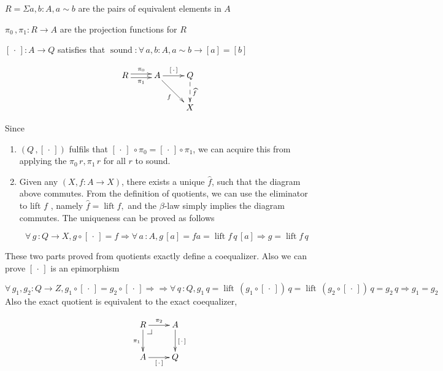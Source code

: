 \documentclass[envcountsame]{llncs}
\makeatletter
\newcommand{\dotph}{\,\cdot\,}
\providecommand{\class}[1]{[#1]}
\providecommand{\dlift}[1]{\widehat{#1}}
\DeclareMathOperator{\sound}{sound}
\DeclareMathOperator{\lift}{lift}
\newcommand{\pullbackcorner}[1][dr]{\save*!/#1-1.2pc/#1:(-1,1)@^{|-}\restore}
\makeatother
\begin{document}
$R = \Sigma a , b : A , a \sim b$  are the pairs of equivalent elements in $A$

$\pi_{0}\,,\pi_{1} \colon R \to A $ are the projection functions for $R$

$\class\dotph \colon A \to Q$ satisfies that $\sound \colon \forall\,a,b \colon A, a \sim b \to \class a = \class b$


\[\xymatrix{
R\ar@<0.5ex>[r]^{\pi_0}\ar@<-0.5ex>[r]_{\pi_1}& A\ar[r]^{\class\dotph}\ar[dr]_{f} & Q\ar@{-->}[d]^{\dlift f}\\
&&X
}\]


Since 
\begin{enumerate}
\item$(Q \,, \class\dotph)$ fulfils that $\class\dotph\ \circ \pi_0 = \class\dotph \circ \pi_1$, we can acquire this from applying the $\pi_{0}\, r ,\pi_{1}\,r$ for all $r $ to sound.
\item Given any $(X, f \colon A \to X)$, there exists a unique $\hat{f}$, such that the diagram above commutes. From the definition of quotients, we can use the eliminator to lift $f$ , namely $\hat{f} = \lift f,  $ and the $\beta$-law simply implies the diagram commutes. The uniqueness can be proved as follows

\[\forall \,g \, \colon Q \to X, g \circ \class\dotph = f \Rightarrow \forall \,a \,\colon A, g \,\class a = f a = \lift f \,q \,\class a  \Rightarrow g = \lift f \,q\]

\end{enumerate}

These two parts proved from quotients
exactly define a coequalizer. Also we can prove $\class\dotph$ is an epimorphism

\[ \forall\, g_1,g_2 : Q \to Z, g_1 \circ \class\dotph = g_2 \circ \class\dotph \Rightarrow  

\Rightarrow  \forall \,q \,\colon Q,  g_{1} \,q = \lift \, (g_1 \circ \class\dotph) \, q = \lift \, (g_2 \circ \class\dotph) \, q = g_2\, q \Rightarrow g_1 = g_2

\]
Also the exact quotient is equivalent to the exact coequalizer,

\[\xymatrix{
R\pullbackcorner\ar[r]^{\pi_2}\ar[d]_{\pi_1} & A\ar[d]^{\class\dotph} \\
A\ar[r]_{\class\dotph} & Q
}\]
\end{document}
